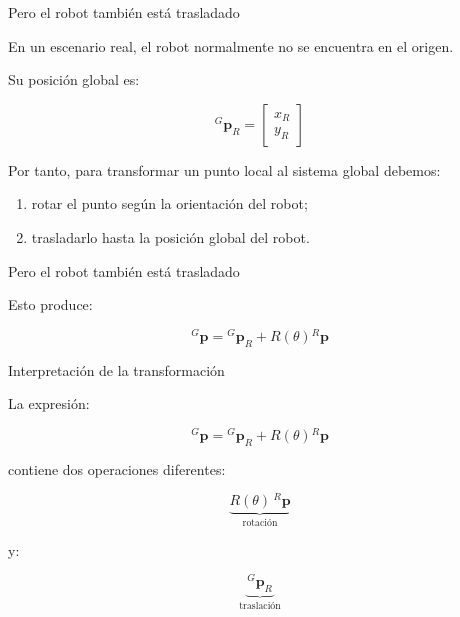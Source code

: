 \documentclass[aspectratio=169]{beamer}
\begin{document}
\begin{frame}{Pero el robot también está trasladado}

    En un escenario real, el robot normalmente no se encuentra en el origen.

    Su posición global es:

    \[
    {}^{G}\mathbf{p}_R
    =
    \begin{bmatrix}
        x_R\\
        y_R
    \end{bmatrix}
    \]

    Por tanto, para transformar un punto local al sistema global debemos:

    \begin{enumerate}
        \item rotar el punto según la orientación del robot;
        \item trasladarlo hasta la posición global del robot.
    \end{enumerate}

\end{frame}

\begin{frame}{Pero el robot también está trasladado}

    Esto produce:

    \[
    \boxed{
        {}^{G}\mathbf{p}
        =
        {}^{G}\mathbf{p}_R
        +
        R(\theta)
        {}^{R}\mathbf{p}
    }
    \]

    \vspace{0.3cm}


\end{frame}

\begin{frame}{Interpretación de la transformación}

    La expresión:

    \[
    {}^{G}\mathbf{p}
    =
    {}^{G}\mathbf{p}_R
    +
    R(\theta)
    {}^{R}\mathbf{p}
    \]

    contiene dos operaciones diferentes:

    \vspace{0.3cm}

    \[
    \underbrace{
        R(\theta)\,{}^{R}\mathbf{p}
    }_{\text{rotación}}
    \]

    y:

    \[
    \underbrace{
        {}^{G}\mathbf{p}_R
    }_{\text{traslación}}
    \]

\end{frame}
\end{document}

